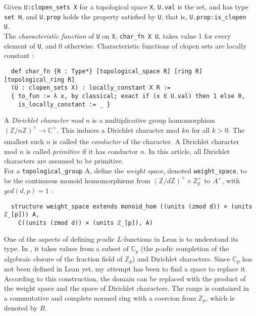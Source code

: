 \documentclass[a4paper,UKenglish,cleveref, autoref, thm-restate]{lipics-v2021}
\newcommand{\lean}[1]{\texttt{#1}\xspace} %
\begin{document}
Given \lean{U:clopen\_sets X} for a topological space \lean{X}, \lean{U.val} is the set, and has type \lean{set H}, and \lean{U.prop} holds the property satisfied by 
\lean{U}, that is, \lean{U.prop:is\_clopen U}. \\

The \textit{characteristic function} of \lean{U} on \lean{X}, \lean{char\_fn X U}, takes value 1
for every element of \lean{U}, and 0 otherwise. Characteristic functions of clopen sets are locally
constant : 
\begin{lstlisting}
  def char_fn {R : Type*} [topological_space R] [ring R] [topological_ring R]
  (U : clopen_sets X) : locally_constant X R := 
  { to_fun := λ x, by classical; exact if (x ∈ U.val) then 1 else 0,
    is_locally_constant := _ } 
\end{lstlisting} 

A \textit{Dirichlet character mod $n$} is a multiplicative group homomorphism 
$(\mathbb{Z}/n\mathbb{Z})^{\times} \xrightarrow[]{} \mathbb{C}^{\times}$. This induces a Dirichlet 
character mod $kn$ for all $k > 0$. The smallest such $n$ is called the \textit{conductor} of the character. 
A Dirichlet character mod $n$ is called \textit{primitive} if it has conductor $n$. In this article, all 
Dirichlet characters are assumed to be primitive. \\

For a \lean{topological\_group} A, define the \textit{weight space}, denoted \lean{weight\_space}, to be the
continuous monoid homomorphisms from
$(\mathbb{Z}/d\mathbb{Z})^{\times} \times \mathbb{Z}_p^{\times}$ to $A^{\times}$, with $gcd(d,p) = 1$ : 
\begin{lstlisting}
  structure weight_space extends monoid_hom ((units (zmod d)) × (units ℤ_[p])) A,
    C((units (zmod d)) × (units ℤ_[p]), A)
\end{lstlisting}

One of the aspects of defining $p$-adic $L$-functions in Lean is to understand its type. In \cite{cyc}, 
it takes values from a subset of $\mathbb{C}_p$ (the $p$-adic completion of the algebraic closure of 
the fraction field of $\mathbb{Z}_p$) and Dirichlet characters. Since $\mathbb{C}_p$ 
has not been defined in Lean yet, my attempt has been to find a space to replace it. According to 
this construction, the domain can be replaced with the product of the weight space and the space of 
Dirichlet characters. The range is contained in a commutative and complete normed ring with a 
coercion from $\mathbb{Z}_p$, which is denoted by $R$.
\end{document}
